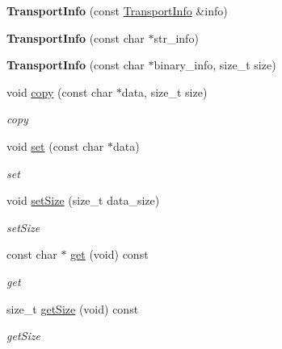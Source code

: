\begin{DoxyCompactItemize}
\item 
\mbox{\label{classAlexaEvent_1_1TransportInfo_a9333221142064594195a95d749703740}} 
{\bfseries Transport\+Info} (const \hyperlink{classAlexaEvent_1_1TransportInfo}{Transport\+Info} \&info)
\item 
\mbox{\label{classAlexaEvent_1_1TransportInfo_acaffd50bc231a7273833e3ab1318b924}} 
{\bfseries Transport\+Info} (const char $\ast$str\+\_\+info)
\item 
\mbox{\label{classAlexaEvent_1_1TransportInfo_aaaf371a16b6250225af7b16fed633ad4}} 
{\bfseries Transport\+Info} (const char $\ast$binary\+\_\+info, size\+\_\+t size)
\item 
void \hyperlink{classAlexaEvent_1_1TransportInfo_a7aa5090ef3266cd45141f7ecc75d853c}{copy} (const char $\ast$data, size\+\_\+t size)
\begin{DoxyCompactList}\small\item\em copy \end{DoxyCompactList}\item 
void \hyperlink{classAlexaEvent_1_1TransportInfo_accc6f5bffd1c0c664028db969401768a}{set} (const char $\ast$data)
\begin{DoxyCompactList}\small\item\em set \end{DoxyCompactList}\item 
void \hyperlink{classAlexaEvent_1_1TransportInfo_a36fd935cc5e9c8bdfaaee5c7e8d00ee7}{set\+Size} (size\+\_\+t data\+\_\+size)
\begin{DoxyCompactList}\small\item\em set\+Size \end{DoxyCompactList}\item 
const char $\ast$ \hyperlink{classAlexaEvent_1_1TransportInfo_a204373f734eb372a1cb46f194a890baf}{get} (void) const
\begin{DoxyCompactList}\small\item\em get \end{DoxyCompactList}\item 
size\+\_\+t \hyperlink{classAlexaEvent_1_1TransportInfo_ad5ab170b605b500ae94424aadcdee4b6}{get\+Size} (void) const
\begin{DoxyCompactList}\small\item\em get\+Size \end{DoxyCompactList}\end{DoxyCompactItemize}


